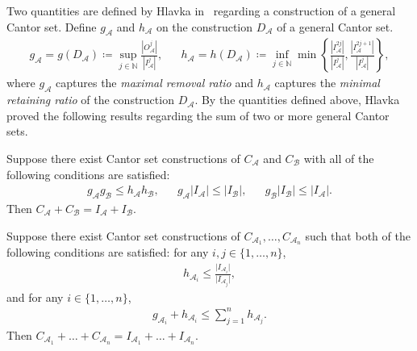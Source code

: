 \documentclass{ws-ijnt}
\begin{document}
	Two quantities are defined by Hlavka in~\cite{Hlavka1975} regarding a construction of a general Cantor set. Define $g_{\mathcal{A}}$ and $h_{\mathcal{A}}$ on the construction $D_{\mathcal{A}}$ of a general Cantor set.
	\begin{align*}
		g_{\mathcal{A}}
		=g(D_{\mathcal{A}})
		\coloneqq \sup_{j\in\mathbb{N}} \frac{\left\lvert O_{\mathcal{A}}^j \right\rvert}{\left\lvert I_{\mathcal{A}}^j \right\rvert}, &&
		h_{\mathcal{A}}
		=h(D_{\mathcal{A}})
		\coloneqq \inf_{j\in\mathbb{N}} \min{\left\{
			\frac{\left\lvert I_{\mathcal{A}}^{2j} \right\rvert}{\left\lvert I_{\mathcal{A}}^j \right\rvert},
			\frac{\left\lvert I_{\mathcal{A}}^{2j+1} \right\rvert}{\left\lvert I_{\mathcal{A}}^j \right\rvert}
			\right\}},
	\end{align*}
	where $g_{\mathcal{A}}$ captures the \emph{maximal removal ratio} and $h_{\mathcal{A}}$ captures the \emph{minimal retaining ratio} of the construction $D_{\mathcal{A}}$. By the quantities defined above, Hlavka proved the following results regarding the sum of two or more general Cantor sets.
	\begin{proposition}\label{prop: hlavka3}
		Suppose there exist Cantor set constructions of $C_{\mathcal{A}}$ and $C_{\mathcal{B}}$ with all of the following conditions are satisfied:
		\begin{align*}
			g_{\mathcal{A}} g_{\mathcal{B}} \leq h_{\mathcal{A}} h_{\mathcal{B}}, &&
			g_{\mathcal{A}} \lvert I_{\mathcal{A}}\rvert \leq \lvert I_{\mathcal{B}} \rvert, &&
			g_{\mathcal{B}} \lvert I_{\mathcal{B}}\rvert \leq \lvert I_{\mathcal{A}} \rvert.
		\end{align*}
		Then $C_{\mathcal{A}}+C_{\mathcal{B}} = I_{\mathcal{A}}+I_{\mathcal{B}}$.
	\end{proposition}
	\begin{proposition}\label{prop: hlavka10}
		Suppose there exist Cantor set constructions of $C_{\mathcal{A}_1}, \ldots, C_{\mathcal{A}_n}$ such that both of the following conditions are satisfied: for any $i,j \in \{1,\dots, n\}$,
		\begin{align*}
			h_{\mathcal{A}_i} \leq \frac{\lvert I_{\mathcal{A}_i} \rvert}{\lvert I_{\mathcal{A}_j} \rvert},
		\end{align*}
		and for any $i\in \{1,\dots, n\}$,
		\begin{align*}
			g_{\mathcal{A}_i}+h_{\mathcal{A}_i} \leq \sum_{j=1}^{n} h_{\mathcal{A}_j}.
		\end{align*}
		Then $C_{\mathcal{A}_1}+\dots+C_{\mathcal{A}_n} = I_{\mathcal{A}_1}+\dots+I_{\mathcal{A}_n}$.
	\end{proposition}
\end{document}
